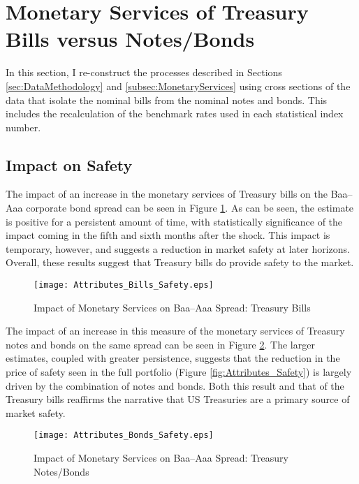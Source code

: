 \documentclass[11pt,a4paper,margin=1.5in]{article}
\begin{document}
\newpage
\section{Monetary Services of Treasury Bills versus Notes/Bonds}
\label{app:MonetaryServices}

In this section, I re-construct the processes described in Sections \ref{sec:DataMethodology} and \ref{subsec:MonetaryServices} using cross sections of the data that isolate the nominal bills from the nominal notes and bonds. 
This includes the recalculation of the benchmark rates used in each statistical index number.

\subsection{Impact on Safety}
The impact of an increase in the monetary services of Treasury bills on the Baa--Aaa corporate bond spread can be seen in Figure \ref{fig:Safety_Bills}.
As can be seen, the estimate is positive for a persistent amount of time, with statistically significance of the impact coming in the fifth and sixth months after the shock.
This impact is temporary, however, and suggests a reduction in market safety at later horizons. 
Overall, these results suggest that Treasury bills do provide safety to the market. 
\begin{figure}[p]
\centering
\texttt{[image: Attributes\_Bills\_Safety.eps]}
\caption{Impact of Monetary Services on Baa--Aaa Spread: Treasury Bills}
\label{fig:Safety_Bills}
\end{figure}

The impact of an increase in this measure of the monetary services of Treasury notes and bonds on the same spread can be seen in Figure \ref{fig:Safety_Bonds}.
The larger estimates, coupled with greater persistence, suggests that the reduction in the price of safety seen in the full portfolio (Figure \ref{fig:Attributes_Safety}) is largely driven by the combination of notes and bonds.
Both this result and that of the Treasury bills reaffirms the narrative that US Treasuries are a primary source of market safety.  
\begin{figure}[p]
\centering
\texttt{[image: Attributes\_Bonds\_Safety.eps]}
\caption{Impact of Monetary Services on Baa--Aaa Spread: Treasury Notes/Bonds}
\label{fig:Safety_Bonds}
\end{figure}
\end{document}
